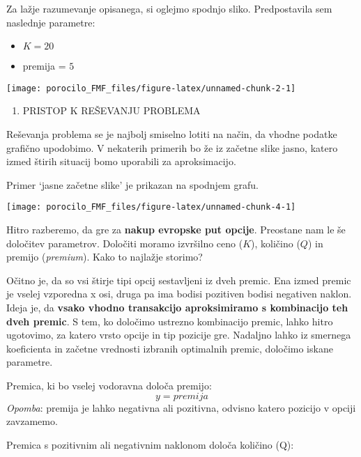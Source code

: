 \documentclass[
]{article}
\providecommand{\tightlist}{%
  \setlength{\itemsep}{0pt}\setlength{\parskip}{0pt}}
\begin{document}
Za lažje razumevanje opisanega, si oglejmo spodnjo sliko. Predpostavila
sem naslednje parametre:

\begin{itemize}
\tightlist
\item
  \(K = 20\)
\item
  premija = \(5\)
\end{itemize}

\begin{center}\texttt{[image: porocilo\_FMF\_files/figure-latex/unnamed-chunk-2-1]} \end{center}

\begin{enumerate}
\def\labelenumi{\arabic{enumi}.}
\setcounter{enumi}{1}
\tightlist
\item
  PRISTOP K REŠEVANJU PROBLEMA
\end{enumerate}

Reševanja problema se je najbolj smiselno lotiti na način, da vhodne
podatke grafično upodobimo. V nekaterih primerih bo že iz začetne slike
jasno, katero izmed štirih situacij bomo uporabili za aproksimacijo.

Primer `jasne začetne slike' je prikazan na spodnjem grafu.

\begin{center}\texttt{[image: porocilo\_FMF\_files/figure-latex/unnamed-chunk-4-1]} \end{center}

Hitro razberemo, da gre za \textbf{nakup evropske put opcije}. Preostane
nam le še določitev parametrov. Določiti moramo izvršilno ceno (\(K\)),
količino (\(Q\)) in premijo (\emph{premium}). Kako to najlažje storimo?

Očitno je, da so vsi štirje tipi opcij sestavljeni iz dveh premic. Ena
izmed premic je vselej vzporedna x osi, druga pa ima bodisi pozitiven
bodisi negativen naklon. Ideja je, da \textbf{vsako vhodno transakcijo
aproksimiramo s kombinacijo teh dveh premic}. S tem, ko določimo
ustrezno kombinacijo premic, lahko hitro ugotovimo, za katero vrsto
opcije in tip pozicije gre. Nadaljno lahko iz smernega koeficienta in
začetne vrednosti izbranih optimalnih premic, določimo iskane parametre.

Premica, ki bo vselej vodoravna določa premijo: \[ y =  premija \]
\emph{Opomba}: premija je lahko negativna ali pozitivna, odvisno katero
pozicijo v opciji zavzamemo.

Premica s pozitivnim ali negativnim naklonom določa količino (Q):
\end{document}
